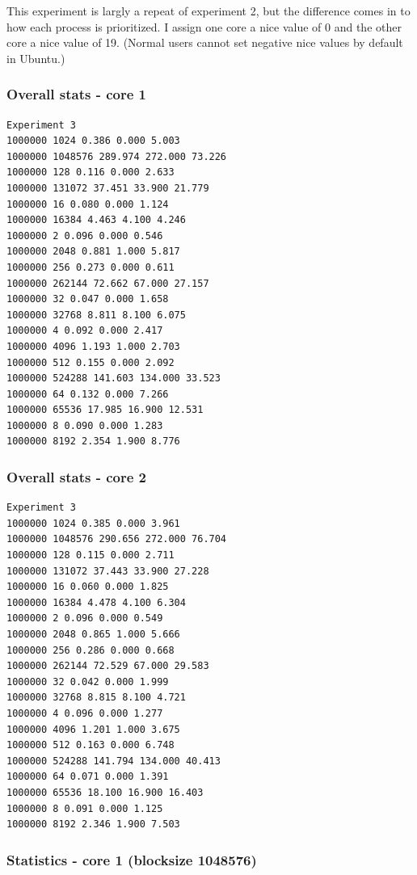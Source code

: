 \documentclass{article}
\begin{document}
This experiment is largly a repeat of experiment 2, but the difference comes in
to how each process is prioritized. I assign one core a nice value of 0 and the
other core a nice value of 19. (Normal users cannot set negative nice values by
default in Ubuntu.)

\subsubsection{Overall stats - core 1}

\begin{lstlisting}
Experiment 3
1000000 1024 0.386 0.000 5.003
1000000 1048576 289.974 272.000 73.226
1000000 128 0.116 0.000 2.633
1000000 131072 37.451 33.900 21.779
1000000 16 0.080 0.000 1.124
1000000 16384 4.463 4.100 4.246
1000000 2 0.096 0.000 0.546
1000000 2048 0.881 1.000 5.817
1000000 256 0.273 0.000 0.611
1000000 262144 72.662 67.000 27.157
1000000 32 0.047 0.000 1.658
1000000 32768 8.811 8.100 6.075
1000000 4 0.092 0.000 2.417
1000000 4096 1.193 1.000 2.703
1000000 512 0.155 0.000 2.092
1000000 524288 141.603 134.000 33.523
1000000 64 0.132 0.000 7.266
1000000 65536 17.985 16.900 12.531
1000000 8 0.090 0.000 1.283
1000000 8192 2.354 1.900 8.776
\end{lstlisting}

\subsubsection{Overall stats - core 2}
\begin{lstlisting}
Experiment 3
1000000 1024 0.385 0.000 3.961
1000000 1048576 290.656 272.000 76.704
1000000 128 0.115 0.000 2.711
1000000 131072 37.443 33.900 27.228
1000000 16 0.060 0.000 1.825
1000000 16384 4.478 4.100 6.304
1000000 2 0.096 0.000 0.549
1000000 2048 0.865 1.000 5.666
1000000 256 0.286 0.000 0.668
1000000 262144 72.529 67.000 29.583
1000000 32 0.042 0.000 1.999
1000000 32768 8.815 8.100 4.721
1000000 4 0.096 0.000 1.277
1000000 4096 1.201 1.000 3.675
1000000 512 0.163 0.000 6.748
1000000 524288 141.794 134.000 40.413
1000000 64 0.071 0.000 1.391
1000000 65536 18.100 16.900 16.403
1000000 8 0.091 0.000 1.125
1000000 8192 2.346 1.900 7.503
\end{lstlisting}

\subsubsection{Statistics - core 1 (blocksize 1048576)}
\end{document}

